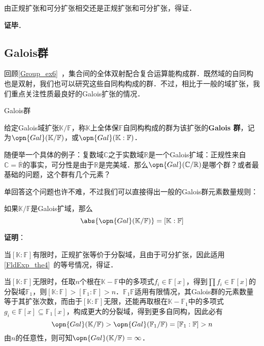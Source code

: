 由正规扩张和可分扩张相交还是正规扩张和可分扩张，得证．

\textbf{证毕}．



\subsection{Galois群}

回顾\autoref{Group_ex6}~，集合间的全体双射配合复合运算能构成群．既然域的自同构也是双射，我们也可以研究这些自同构构成的群．不过，相比于一般的域扩张，我们重点关注性质最良好的Galois扩张的情况．

\begin{definition}{Galois群}

给定Galois域扩张$\mathbb{K}/\mathbb{F}$，称$\mathbb{K}$上全体保$\mathbb{F}$自同构构成的群为该扩张的\textbf{Galois 群}，记为$\opn{Gal}(\mathbb{K}/\mathbb{F})$，或$\opn{Gal}(\mathbb{K}:\mathbb{F})$．

\end{definition}


随便举一个具体的例子：复数域$\mathbb{C}$之于实数域$\mathbb{R}$是一个Galois扩域：正规性来自$\mathbb{C}=\overline{\mathbb{R}}$的事实，可分性是由于$\mathbb{R}$是完美域．那么$\opn{Gal}(\mathbb{C}/\mathbb{R})$是哪个群？或者最基础的问题，这个群有几个元素？

单回答这个问题也许不难，不过我们可以直接得出一般的Galois群元素数量规则：

\begin{theorem}{}\label{GExt_the2}
如果$\mathbb{K}/\mathbb{F}$是Galois扩域，那么
\begin{equation}
\abs{\opn{Gal}(\mathbb{K}/\mathbb{F})} = [\mathbb{K}:\mathbb{F}]
\end{equation}
\end{theorem}

\textbf{证明}：

当$[\mathbb{K}:\mathbb{F}]$有限时，正规扩张等价于分裂域，且由于可分扩张，因此适用\autoref{FldExp_the4}~的等号情况，得证．

当$[\mathbb{K}:\mathbb{F}]$无限时，任取$n$个根在$\mathbb{K}-\mathbb{F}$中的多项式$f_i\in\mathbb{F}[x]$，得到$\prod f_i\in\mathbb{F}[x]$的分裂域$\mathbb{F}_1$，则$[\mathbb{K}:\mathbb{F}]>[\mathbb{F}_1:\mathbb{F}]>n$．$\mathbb{F}_1\mathbb{F}$适用有限情况，其Galois群的元素数量等于其扩张次数，而由于$[\mathbb{K}:\mathbb{F}]$无限，还能再取根在$\mathbb{K}-\mathbb{F}_1$中的多项式$g_i\in\mathbb{F}[x]\subseteq \mathbb{F}_1[x]$，构成更大的分裂域，得到更多自同构，因此必有
\begin{equation}
\opn{Gal}(\mathbb{K}/\mathbb{F})>\opn{Gal}(\mathbb{F}_1/\mathbb{F})=[\mathbb{F}_1:\mathbb{F}]>n
\end{equation}
由$n$的任意性，则可知$\opn{Gal}(\mathbb{K}/\mathbb{F})=\infty$．


